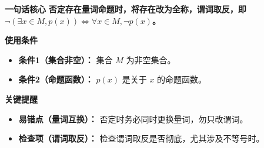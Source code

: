 \begin{summarybox}
	\textbf{\textcolor{CSummary}{一句话核心}}
	\textbf{否定存在量词命题时，将存在改为全称，谓词取反，即 $\neg(\exists x\in M,p(x))\iff \forall x\in M,\neg p(x)$。}\par

	\medskip
	\textbf{\textcolor{CSummary}{使用条件}}
	\begin{itemize}[leftmargin=*, itemsep=0.5em, topsep=0.4em]
		\item \textbf{条件1（集合非空）：} 集合 $M$ 为非空集合。
		\item \textbf{条件2（命题函数）：} $p(x)$ 是关于 $x$ 的命题函数。
	\end{itemize}
	\par

	\medskip
	\textbf{\textcolor{CSummary}{关键提醒}}
	\begin{itemize}[leftmargin=*, itemsep=0.5em, topsep=0.4em]
		\item \textbf{易错点（量词互换）：} 否定时务必同时更换量词，勿只改谓词。
		\item \textbf{检查项（谓词取反）：} 检查谓词取反是否彻底，尤其涉及不等号时。
	\end{itemize}

\end{summarybox}
